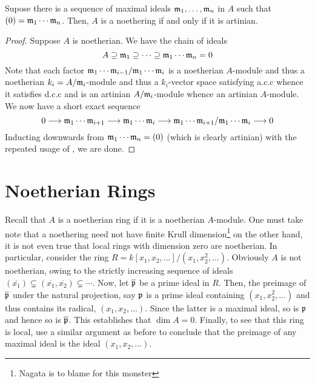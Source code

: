 \begin{lemma}
    Supose there is a sequence of maximal ideals $\mathfrak m_1,\ldots,\mathfrak m_n$ in $A$ such that $(0) = \mathfrak m_1\cdots\mathfrak m_n$. Then, $A$ is a noethering if and only if it is artinian.
\end{lemma}
\begin{proof}
    Suppose $A$ is noetherian. We have the chain of ideals 
    \begin{equation*}
        A\supseteq\mathfrak m_1\supseteq\dots\supseteq\mathfrak m_1\cdots\mathfrak m_n = 0
    \end{equation*}
    Note that each factor $\mathfrak m_1\cdots\mathfrak m_{i - 1}/\mathfrak m_1\cdots\mathfrak m_i$ is a noetherian $A$-module and thus a noetherian $k_i = A/\mathfrak m_i$-module and thus a $k_i$-vector space satisfying a.c.c whence it satisfies d.c.c and is an artinian $A/\mathfrak m_i$-module whence an artinian $A$-module. We now have a short exact sequence 
    \begin{equation*}
        0\longrightarrow\mathfrak m_1\cdots\mathfrak m_{i + 1}\longrightarrow\mathfrak m_1\cdots\mathfrak m_i\longrightarrow\mathfrak m_1\cdots\mathfrak m_{i + 1}/\mathfrak m_1\cdots\mathfrak m_i\longrightarrow 0
    \end{equation*}
    Inducting downwards from $\mathfrak m_1\cdots\mathfrak m_n = (0)$ (which is clearly artinian) with the repeated usage of , we are done.
\end{proof}

\section{Noetherian Rings}

Recall that $A$ is a noetherian ring if it is a noetherian $A$-module. One must take note that a noethering need not have finite Krull dimension\footnote{Nagata is to blame for this monster} on the other hand, it is not even true that local rings with dimension zero are noetherian. In particular, consider the ring $R = k[x_1,x_2,\ldots]/(x_1,x_2^2,\ldots)$. Obviously $A$ is not noetherian, owing to the strictly increasing sequence of ideals $(\overline{x_1})\subsetneq(\overline{x_1},\overline{x_2})\subsetneq\cdots$. Now, let $\overline{\mathfrak p}$ be a prime ideal in $R$. Then, the preimage of $\overline{\mathfrak p}$ under the natural projection, say $\mathfrak p$ is a prime ideal containing $(x_1,x_2^2,\ldots)$ and thus contains its radical, $(x_1,x_2,\ldots)$. Since the latter is a maximal ideal, so is $\mathfrak p$ and hence so is $\overline{\mathfrak p}$. This establishes that $\dim A = 0$. Finally, to see that this ring is local, use a similar argument as before to conclude that the preimage of any maximal ideal is the ideal $(x_1,x_2,\ldots)$.

